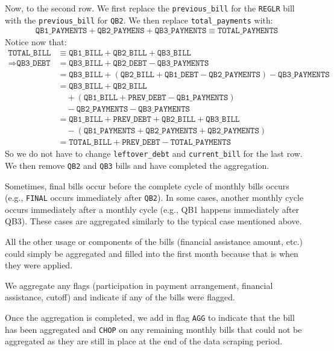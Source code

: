 \documentclass[11pt]{article}
\begin{document}
Now, to the second row. We first replace the \texttt{previous\_bill} for the \texttt{REGLR} bill with the \texttt{previous\_bill} for \texttt{QB2}. We then replace \texttt{total\_payments} with:
\begin{align*}
\texttt{QB1\_PAYMENTS}+\texttt{QB2\_PAYMENS}+\texttt{QB3\_PAYMENTS}\equiv\texttt{TOTAL\_PAYMENTS}
\end{align*}
Notice now that:
\begin{align*}
\texttt{TOTAL\_BILL} & \equiv\texttt{QB1\_BILL}+\texttt{QB2\_BILL}+\texttt{QB3\_BILL} \\
\Rightarrow\texttt{QB3\_DEBT} & =\texttt{QB3\_BILL}+\texttt{QB2\_DEBT}-\texttt{QB3\_PAYMENTS} \\
& =\texttt{QB3\_BILL}+(\texttt{QB2\_BILL}+\texttt{QB1\_DEBT}-\texttt{QB2\_PAYMENTS})-\texttt{QB3\_PAYMENTS} \\
& =\texttt{QB3\_BILL}+\texttt{QB2\_BILL} \\
& \quad+(\texttt{QB1\_BILL}+\texttt{PREV\_DEBT}-\texttt{QB1\_PAYMENTS}) \\
& \quad-\texttt{QB2\_PAYMENTS}-\texttt{QB3\_PAYMENTS} \\
& =\texttt{QB1\_BILL}+\texttt{PREV\_DEBT}+\texttt{QB2\_BILL}+\texttt{QB3\_BILL} \\
& \quad-(\texttt{QB1\_PAYMENTS}+\texttt{QB2\_PAYMENTS}+\texttt{QB2\_PAYMENTS}) \\
& =\texttt{TOTAL\_BILL}+\texttt{PREV\_DEBT}-\texttt{TOTAL\_PAYMENTS}
\end{align*}
So we do not have to change \texttt{leftover\_debt} and \texttt{current\_bill} for the last row. We then remove \texttt{QB2} and \texttt{QB3} bills and have completed the aggregation.

Sometimes, final bills occur before the complete cycle of monthly bills occurs (e.g., \texttt{FINAL} occurs immediately after \texttt{QB2}). In some cases, another monthly cycle occurs immediately after a monthly cycle (e.g., QB1 happens immediately after QB3). These cases are aggregated similarly to the typical case mentioned above.

All the other usage or components of the bills (financial assistance amount, etc.) could simply be aggregated and filled into the first month because that is when they were applied.

We aggregate any flags (participation in payment arrangement, financial assistance, cutoff) and indicate if any of the bills were flagged.

Once the aggregation is completed, we add in flag \texttt{AGG} to indicate that the bill has been aggregated and \texttt{CHOP} on any remaining monthly bills that could not be aggregated as they are still in place at the end of the data scraping period.
\end{document}

